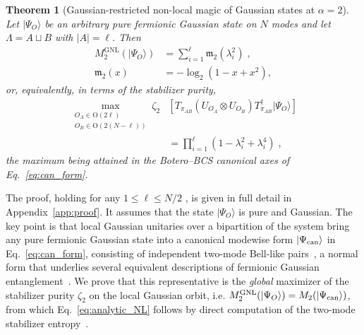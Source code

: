 \documentclass[prx,twocolumn,superscriptaddress,aps,10pt, frontmatterverbose, reprint,footinbib,longbibliography=true]{revtex4-2}
\newtheorem{theorem}{Theorem}
\newcommand{\RENYI}{\alpha}
\begin{document}
\begin{theorem}[Gaussian-restricted non-local magic of Gaussian states at $\RENYI=2$]
\label{thm:global}
Let $|\Psi_O\rangle$ be an arbitrary pure fermionic Gaussian state on $N$ modes and let $\Lambda=A\sqcup B$ with $|A|=\ell$. Then
\begin{equation}
\begin{split}
    M_{2}^{\mathrm{GNL}}(|\Psi_O\rangle)&=\sum_{i=1}^{\ell}\mathfrak{m}_2(\lambda_i^2)\;,\\
    \mathfrak{m}_2(x)&=-\log_2\!\left(1-x+x^2\right),
\end{split}
    \label{eq:analytic_NL}
\end{equation}
or, equivalently, in terms of the stabilizer purity,
\begin{equation}
\begin{split}
\max_{\substack{O_A\in \mathrm{O}(2\ell)\\ O_B\in \mathrm{O}(2(N-\ell))}}\!\!\!\!\zeta_2&\left[T_{\pi_{AB}}(U_{O_A}\otimes U_{O_B})T_{\pi_{AB}}^\dagger|\Psi_O\rangle\right]\\ &=\prod_{i=1}^{\ell}\left(1-\lambda_i^2+\lambda_i^4\right)\;,
\end{split}
\label{eq:thm_zeta}
\end{equation}
the maximum being attained in the Botero--BCS canonical axes of Eq.~\eqref{eq:can_form}.
\end{theorem}

The proof, holding for any $1\le\ell\le N/2$ , is given in full detail in Appendix~\ref{app:proof}. It assumes that the state $|\Psi_O\rangle$ is pure and Gaussian.
The key point is that local Gaussian unitaries over a bipartition of the system bring any pure fermionic Gaussian state into a canonical modewise form $\ket{\Psi_{\rm can}}$ in Eq.~\eqref{eq:can_form}, consisting of independent two-mode Bell-like pairs~\cite{BoteroReznik2004}, a normal form that underlies several equivalent descriptions of fermionic Gaussian entanglement~\cite{SpeeSchwaigerGiedkeKraus2018,MorralYepesLangerGammonSmithKrausPollmann2025,langer2026matchgatecircuitrepresentationfermionic}.
We prove that this representative is the \emph{global} maximizer of the stabilizer purity $\zeta_2$ on the local Gaussian orbit, i.e.
$M_{2}^{\mathrm{GNL}}(|\Psi_O\rangle) = M_{2}(|\Psi_{\rm can}\rangle)$,
from which Eq.~\eqref{eq:analytic_NL} follows by direct computation of the two-mode stabilizer entropy~\cite{Cao_2025,qian2025quantumnonlocalnonstabilizerness}.
\end{document}
